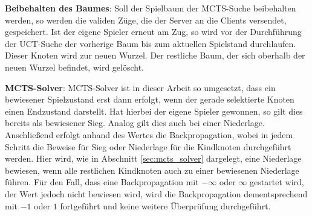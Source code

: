 \documentclass[12pt,a4paper,bibliography=totocnumbered,listof=totocnumbered]{article}
\begin{document}
\textbf{Beibehalten des Baumes}: Soll der Spielbaum der MCTS-Suche beibehalten werden, so werden die validen Züge, die der Server an die Clients versendet, gespeichert. Ist der eigene Spieler erneut am Zug, so wird vor der Durchführung der UCT-Suche der vorherige Baum bis zum aktuellen Spielstand durchlaufen. Dieser Knoten wird zur neuen Wurzel. Der restliche Baum, der sich oberhalb der neuen Wurzel befindet, wird gelöscht.

\textbf{MCTS-Solver}: MCTS-Solver ist in dieser Arbeit so umgesetzt, dass ein bewiesener Spielzustand erst dann erfolgt, wenn der gerade selektierte Knoten einen Endzustand darstellt. Hat hierbei der eigene Spieler gewonnen, so gilt dies bereits als bewiesener Sieg. Analog gilt dies auch bei einer Niederlage. Anschließend erfolgt anhand des Wertes die Backpropagation, wobei in jedem Schritt die Beweise für Sieg oder Niederlage für die Kindknoten durchgeführt werden. Hier wird, wie in Abschnitt \ref{sec:mcts_solver} dargelegt, eine Niederlage bewiesen, wenn alle restlichen Kindknoten auch zu einer bewiesenen Niederlage führen. Für den Fall, dass eine Backpropagation mit $-\infty$ oder $\infty$ gestartet wird, der Wert jedoch nicht bewiesen wird, wird die Backpropagation dementsprechend mit $-1$ oder $1$ fortgeführt und keine weitere Überprüfung durchgeführt.
\end{document}
